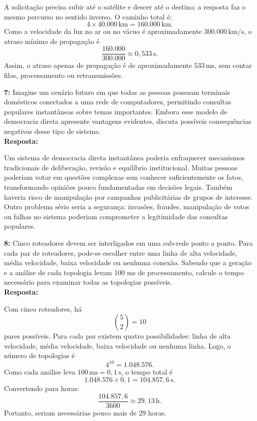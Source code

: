 \documentclass[12pt,a4paper]{report}
\begin{document}
A solicitação precisa subir até o satélite e descer até o destino; a resposta faz o mesmo percurso no sentido inverso. O caminho total é:
\[
    4 \times 40.000\,\text{km}=160.000\,\text{km}.
\]
Como a velocidade da luz no ar ou no vácuo é aproximadamente \(300.000\,\text{km/s}\), o atraso mínimo de propagação é
\[
    \frac{160.000}{300.000}\approx 0{,}533\,\text{s}.
\]
Assim, o atraso apenas de propagação é de aproximadamente \(533\,\text{ms}\), sem contar filas, processamento ou retransmissões.

\vspace{0.6cm}

\noindent \textbf{7:} Imagine um cenário futuro em que todas as pessoas possuam terminais domésticos conectados a uma rede de computadores, permitindo consultas populares instantâneas sobre temas importantes. Embora esse modelo de democracia direta apresente vantagens evidentes, discuta possíveis consequências negativas desse tipo de sistema. \\
\textbf{Resposta:}

Um sistema de democracia direta instantânea poderia enfraquecer mecanismos tradicionais de deliberação, revisão e equilíbrio institucional. Muitas pessoas poderiam votar em questões complexas sem conhecer suficientemente os fatos, transformando opiniões pouco fundamentadas em decisões legais. Também haveria risco de manipulação por campanhas publicitárias de grupos de interesse. Outro problema sério seria a segurança: invasões, fraudes, manipulação de votos ou falhas no sistema poderiam comprometer a legitimidade das consultas populares.

\vspace{0.6cm}

\noindent \textbf{8:} Cinco roteadores devem ser interligados em uma sub-rede ponto a ponto. Para cada par de roteadores, pode-se escolher entre uma linha de alta velocidade, média velocidade, baixa velocidade ou nenhuma conexão. Sabendo que a geração e a análise de cada topologia levam 100 ms de processamento, calcule o tempo necessário para examinar todas as topologias possíveis. \\
\textbf{Resposta:}

Com cinco roteadores, há
\[
    \binom{5}{2}=10
\]
pares possíveis. Para cada par existem quatro possibilidades: linha de alta velocidade, média velocidade, baixa velocidade ou nenhuma linha. Logo, o número de topologias é
\[
    4^{10}=1.048.576.
\]
Como cada análise leva \(100\,\text{ms}=0{,}1\,\text{s}\), o tempo total é
\[
    1.048.576 \times 0{,}1 = 104.857{,}6\,\text{s}.
\]
Convertendo para horas:
\[
    \frac{104.857{,}6}{3600}\approx 29{,}13\,\text{h}.
\]
Portanto, seriam necessárias pouco mais de 29 horas.
\end{document}
